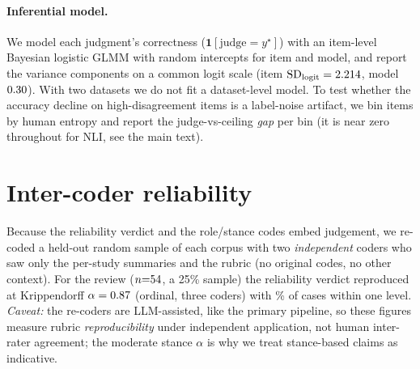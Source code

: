 \paragraph{Inferential model.} We model each judgment's correctness ($\mathbf{1}[\text{judge}=y^\star]$) with an
item-level Bayesian logistic GLMM with random intercepts for item and model, and report the variance components on a
common logit scale (item $\mathrm{SD}_{\text{logit}}=2.214$, model $0.30$). With two datasets
we do not fit a dataset-level model. To test whether the accuracy decline on high-disagreement items is a label-noise
artifact, we bin items by human entropy and report the judge-vs-ceiling \emph{gap} per bin (it is near zero
throughout for NLI, see the main text).

\section{Inter-coder reliability}\label{app:irr}
Because the reliability verdict and the role/stance codes embed judgement, we re-coded a held-out random sample of
each corpus with two \emph{independent} coders who saw only the per-study summaries and the rubric (no original
codes, no other context). For the review ($n{=}54$, a 25\% sample) the reliability verdict reproduced at
Krippendorff $\alpha=0.87$ (ordinal, three coders) with \IRRsoneWone\% of cases within one level.
\emph{Caveat:} the re-coders are
LLM-assisted, like the primary pipeline, so these figures measure rubric \emph{reproducibility} under independent
application, not human inter-rater agreement; the moderate stance $\alpha$ is why we treat stance-based claims as
indicative.

